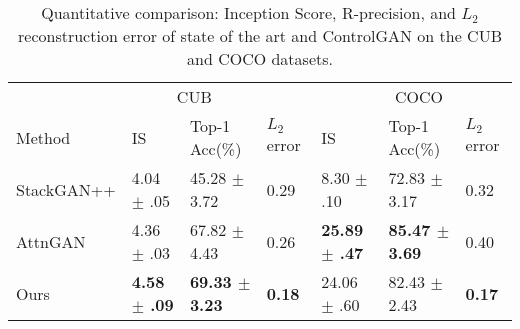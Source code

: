 \documentclass{article}
\begin{document}
\begin{table}
\small
  \caption{Quantitative comparison: Inception Score, R-precision, and \(L_{2}\) reconstruction error of state of the art and ControlGAN on the CUB and COCO datasets.}
  \label{quantity}
  \centering
  \bigskip
  \begin{tabular}{lllllll}
    \toprule
    \multicolumn{5}{c}{CUB} &
    \multicolumn{1}{c}{COCO}     \\             
    \cmidrule(r){2-4}
    \cmidrule(r){5-7}
    Method     & IS     & Top-1 Acc(\%)  & \(L_{2}\) error     & IS & Top-1 Acc(\%) & \(L_{2}\) error\\
    \midrule
    StackGAN++ & 4.04 $\pm$ .05  & 45.28 $\pm$ 3.72  & 0.29  & 8.30 $\pm$ .10 & 72.83 $\pm$ 3.17 & 0.32 \\
    AttnGAN    & 4.36 $\pm$ .03  & 67.82 $\pm$ 4.43 & 0.26     & \textbf{25.89 $\pm$ .47} & \textbf{85.47 $\pm$ 3.69} & 0.40\\
    Ours     & \textbf{4.58 $\pm$ .09}   & \textbf{69.33 $\pm$ 3.23}   & \textbf{0.18}     & 24.06 $\pm$ .60 &82.43 $\pm$ 2.43 & \textbf{0.17}\\
    \bottomrule
  \end{tabular}
  \label{tabel:quant_cmp}
\end{table}
\end{document}

